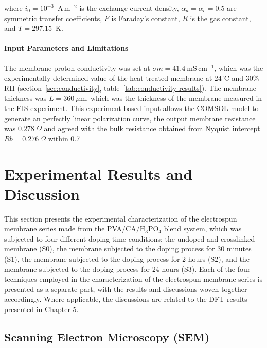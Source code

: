 \documentclass[12pt,a4paper]{report}
\begin{document}
where \(i_0 = 10^{-3}\)~A\,m\(^{-2}\) is the exchange current 
density, \(\alpha_a = \alpha_c = 0.5\) are symmetric transfer 
coefficients, \(F\) is Faraday's constant, \(R\) is the gas 
constant, and \(T = 297.15\)~K.

\subsubsection{Input Parameters and Limitations}

The membrane proton conductivity was set at $\sigma{m} = 41.4\ \mathrm{mS\,cm^{-1}}$, which was the experimentally determined value of the heat-treated membrane at $24^{\circ}\text{C}$ and $30\%$ RH (section~\ref{sec:conductivity}, table~\ref{tab:conductivity-results}). The membrane thickness was $L = 360\ \mu\text{m}$, which was the thickness of the membrane measured in the EIS experiment. This experiment-based input allows the COMSOL model to generate an perfectly linear polarization curve, the output membrane resistance was $0.278\ \Omega$ and agreed with the bulk resistance obtained from Nyquist intercept $Rb=0.276\ \Omega$ within 0.7%

\chapter{Experimental Results and Discussion}

This section presents the experimental characterization of the electrospun membrane series made from the PVA/CA/H\(_3\)PO\(_4\) blend system, which was subjected to four different doping time conditions: the undoped and crosslinked membrane (S0), the membrane subjected to the doping process for 30 minutes (S1), the membrane subjected to the doping process for 2 hours (S2), and the membrane subjected to the doping process for 24 hours (S3). Each of the four techniques employed in the characterization of the electrospun membrane series is presented as a separate part, with the results and discussions woven together accordingly. Where applicable, the discussions are related to the DFT results presented in Chapter 5.

\section{Scanning Electron Microscopy (SEM)}
\end{document}
